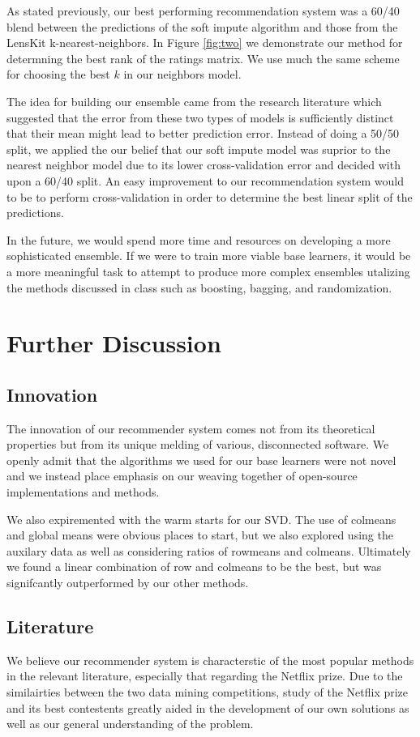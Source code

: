 \documentclass[oneside]{article}
\begin{document}
As stated previously, our best performing recommendation system was a 60/40 blend between the predictions of the soft impute algorithm and those from the LensKit k-nearest-neighbors. In Figure \ref{fig:two} we demonstrate our method for determning the best rank of the ratings matrix. We use much the same scheme for choosing the best $k$ in our neighbors model. 

The idea for building our ensemble came from the research literature which suggested that the error from these two types of models is sufficiently distinct that their mean might lead to better prediction error. Instead of doing a 50/50 split, we applied the our belief that our soft impute model was suprior to the nearest neighbor model due to its lower cross-validation error and decided with upon a 60/40 split. An easy improvement to our recommendation system would to be to perform cross-validation in order to determine the best linear split of the predictions.

In the future, we would spend more time and resources on developing a more sophisticated ensemble. If we were to train more viable base learners, it would be a more meaningful task to attempt to produce more complex ensembles utalizing the methods discussed in class such as boosting, bagging, and randomization.  

\section{Further Discussion}

\subsection{Innovation}
The innovation of our recommender system comes not from its theoretical properties but from its unique melding of various, disconnected software. We openly admit that the algorithms we used for our base learners were not novel and we instead place emphasis on our weaving together of open-source implementations and methods.

We also expiremented with the warm starts for our SVD. The use of colmeans and global means were obvious places to start, but we also explored using the auxilary data as well as considering ratios of rowmeans and colmeans. Ultimately we found a linear combination of row and colmeans to be the best, but was signifcantly outperformed by our other methods. 

\subsection{Literature}
We believe our recommender system is characterstic of the most popular methods in the relevant literature, especially that regarding the Netflix prize. Due to the similairties between the two data mining competitions, study of the Netflix prize and its best contestents greatly aided in the development of our own solutions as well as our general understanding of the problem. 
\end{document}
